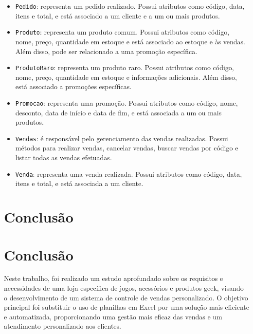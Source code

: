 \documentclass[
	12pt,				%
	openright,			%
	twoside,			%
	a4paper,			%
	english,			%
	brazil				%
	]{abntex2}
\begin{document}
\begin{itemize}
    \item \texttt{Pedido}: representa um pedido realizado. Possui atributos como código, data, itens e total, e está associado a um cliente e a um ou mais produtos.
    
    \item \texttt{Produto}: representa um produto comum. Possui atributos como código, nome, preço, quantidade em estoque e está associado ao estoque e às vendas. Além disso, pode ser relacionado a uma promoção específica.
    
    \item \texttt{ProdutoRaro}: representa um produto raro. Possui atributos como código, nome, preço, quantidade em estoque e informações adicionais. Além disso, está associado a promoções específicas.
    
    \item \texttt{Promocao}: representa uma promoção. Possui atributos como código, nome, desconto, data de início e data de fim, e está associada a um ou mais produtos.
    
    \item \texttt{Vendas}: é responsável pelo gerenciamento das vendas realizadas. Possui métodos para realizar vendas, cancelar vendas, buscar vendas por código e listar todas as vendas efetuadas.
    
    \item \texttt{Venda}: representa uma venda realizada. Possui atributos como código, data, itens e total, e está associada a um cliente.
\end{itemize}



\chapter{Conclusão}


\chapter{Conclusão}

Neste trabalho, foi realizado um estudo aprofundado sobre os requisitos e necessidades de uma loja específica de jogos, acessórios e produtos geek, visando o desenvolvimento de um sistema de controle de vendas personalizado. O objetivo principal foi substituir o uso de planilhas em Excel por uma solução mais eficiente e automatizada, proporcionando uma gestão mais eficaz das vendas e um atendimento personalizado aos clientes.
\end{document}
